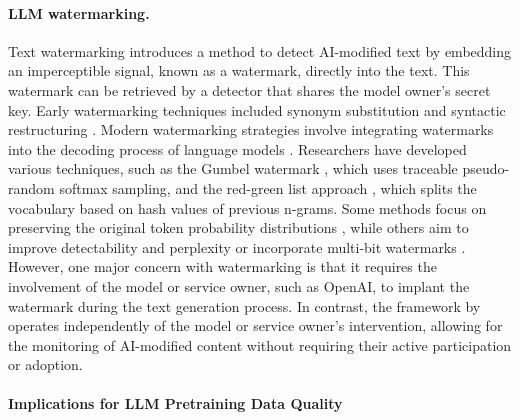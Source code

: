 \documentclass{article}
\begin{document}
\paragraph{LLM watermarking.} 
Text watermarking introduces a method to detect AI-modified text by embedding an imperceptible signal, known as a watermark, directly into the text. This watermark can be retrieved by a detector that shares the model owner's secret key. Early watermarking techniques included synonym substitution \citep{Chiang2003NaturalLW, Topkara2006TheHV} and syntactic restructuring \citep{Atallah2001NaturalLW, Topkara2006NaturalLW}. Modern watermarking strategies involve integrating watermarks into the decoding process of language models \citep{aaronson, kirchenbauer2023watermark, Zhao2023Ginsew}. Researchers have developed various techniques, such as the Gumbel watermark \citep{aaronson}, which uses traceable pseudo-random softmax sampling, and the red-green list approach \citep{kirchenbauer2023watermark, Zhao2023ProvableRW}, which splits the vocabulary based on hash values of previous n-grams. Some methods focus on preserving the original token probability distributions \citep{ Hu2023UnbiasedWF,Kuditipudi2023RobustDW, Wu2023DiPmarkAS}, while others aim to improve detectability and perplexity \citep{zhao2024permute} or incorporate multi-bit watermarks \citep{Yoo2023RobustMN, Fernandez2023ThreeBT}. However, one major concern with watermarking is that it requires the involvement of the model or service owner, such as OpenAI, to implant the watermark during the text generation process. 
In contrast, the framework by \cite{liang2024monitoring} operates independently of the model or service owner's intervention, allowing for the monitoring of AI-modified content without requiring their active participation or adoption.


\paragraph{Implications for LLM Pretraining Data Quality} 
\end{document}
